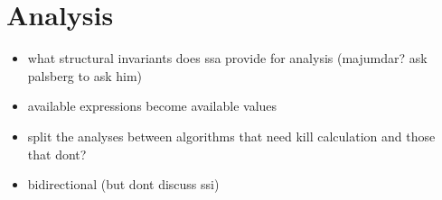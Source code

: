 \part{Analysis}

\begin{itemize}
 \item what structural invariants does ssa provide for analysis (majumdar? ask palsberg to ask him)
 \item available expressions become available values
 \item split the analyses between algorithms that need kill calculation and those that dont?
 \item bidirectional (but dont discuss ssi)
\end{itemize}



